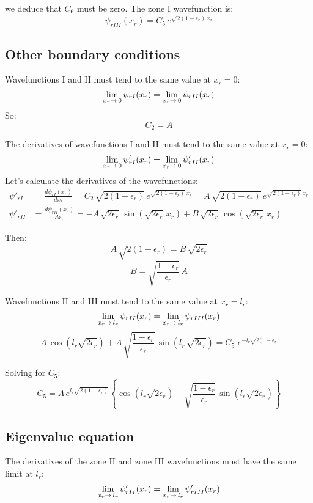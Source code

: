 we deduce that $C_6$ must be zero. The zone I wavefunction is:
\[
\psi_{rIII}(x_r) = C_5\,e^{\sqrt{2(1-\epsilon_r)}\,x_r}
\]

\subsection{Other boundary conditions}

Wavefunctions I and II must tend to the same value at $x_r=0$:
\[
\lim_{\scriptsize x_r\to\,0} \psi_{rI}(x_r)
=
\lim_{\scriptsize x_r\to\,0} \psi_{rII}(x_r)
\]
So:
\[
C_2 = A
\]

The derivatives of wavefunctions I and II must tend to the same value at
 $x_r=0$:
\[
\lim_{\scriptsize x_r\to\,0} \psi'_{rI}(x_r)
=
\lim_{\scriptsize x_r\to\,0} \psi'_{rII}(x_r)
\]
Let's calculate the derivatives of the wavefunctions:
\begin{align*}
\psi'_{rI} &= \frac{d\psi_{rI}(x_r)}{dx_r}
  = C_2\,\sqrt{2(1-\epsilon_r)}\,e^{\sqrt{2(1-\epsilon_r)}\,x_r}
  = A\,\sqrt{2(1-\epsilon_r)}\,e^{\sqrt{2(1-\epsilon_r)}\,x_r}\\
\psi'_{rII} &= \frac{d\psi_{rII}(x_r)}{dx_r}
  = -A\,\sqrt{2\epsilon_r}\,\sin\left(\sqrt{2\epsilon_r}\,x_r\right)
  + B\,\sqrt{2\epsilon_r}\,\cos\left(\sqrt{2\epsilon_r}\,x_r\right)
\end{align*}

Then:
\[
A\,\sqrt{2(1-\epsilon_r)} =  B\,\sqrt{2\epsilon_r}
\]
\[
B = \sqrt{\frac{1-\epsilon_r}{\epsilon_r}}\,A
\]

Wavefunctions II and III must tend to the same value at $x_r=l_r$:
\[
\lim_{\scriptsize x_r\to\,l_r} \psi_{rII}(x_r)
=
\lim_{\scriptsize x_r\to\,l_r} \psi_{rIII}(x_r)
\]
\[
A\,\cos\left(l_r\sqrt{2\epsilon_r}\right)
 + A\,\sqrt{\frac{1-\epsilon_r}{\epsilon_r}}
   \,\sin\left(l_r\,\sqrt{2\epsilon_r}\right)
=
C_5\,\,e^{-l_r\sqrt{2(1-\epsilon_r}}
\]

Solving for $C_5$:
\begin{equation}
\label{c5_1}
C_5 = A\,e^{l_r\sqrt{2(1-\epsilon_r)}}
  \left\lbrace\cos\left(l_r\sqrt{2\epsilon_r}\right) 
  + \sqrt{\frac{1-\epsilon_r}{\epsilon_r}}\,
         \sin\left(l_r\sqrt{2\epsilon_r}\right)\right\rbrace
\end{equation}

\subsection{Eigenvalue equation}
The derivatives of the zone II and zone III wavefunctions must have the same
limit at $l_r$:
\[
\lim_{\scriptsize x_r\to\,l_r} \psi'_{rII}(x_r)
=
\lim_{\scriptsize x_r\to\,l_r} \psi'_{rIII}(x_r)
\]

